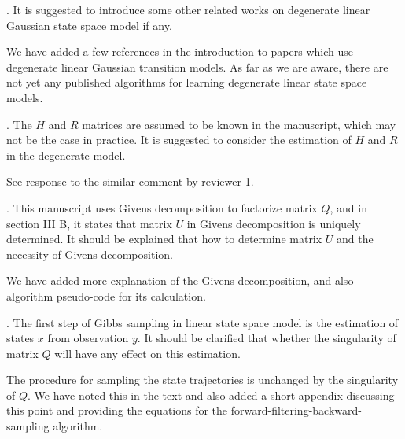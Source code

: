 \documentclass{article}
\newenvironment{review}[0]{\begin{itshape}\color{Gray}\noindent}{\end{itshape}\vspace{0.4cm}}
\newenvironment{response}[0]{\noindent}{\vspace{0.4cm}}
\begin{document}
\begin{review}
2.  It is suggested to introduce some other related works on degenerate linear Gaussian state space model if any.
\end{review}

\begin{response}
 We have added a few references in the introduction to papers which use degenerate linear Gaussian transition models. As far as we are aware, there are not yet any published algorithms for learning degenerate linear state space models.
\end{response}

\begin{review}
3.  The $H$ and $R$ matrices are assumed to be known in the manuscript, which may not be the case in practice. It is suggested to consider the estimation of $H$ and $R$ in the degenerate model.
\end{review}

\begin{response}
 See response to the similar comment by reviewer 1.
\end{response}

\begin{review}
4.  This manuscript uses Givens decomposition to factorize matrix $Q$, and in section III B, it states that matrix $U$ in Givens decomposition is uniquely determined. It should be explained that how to determine matrix $U$ and the necessity of Givens decomposition.
\end{review}

\begin{response}
 We have added more explanation of the Givens decomposition, and also algorithm pseudo-code for its calculation.
\end{response}

\begin{review}
5.   The first step of Gibbs sampling in linear state space model is the estimation of states $x$ from observation $y$. It should be clarified that whether the singularity of matrix $Q$ will have any effect on this estimation. 
\end{review}

\begin{response}
 The procedure for sampling the state trajectories is unchanged by the singularity of $Q$. We have noted this in the text and also added a short appendix discussing this point and providing the equations for the forward-filtering-backward-sampling algorithm.
\end{response}
\end{document}
